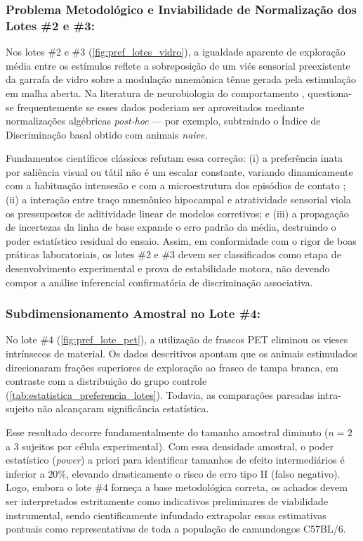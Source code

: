 \documentclass[11pt,a4paper,article,brazil]{abntex2}
\begin{document}
\subsubsection{Problema Metodológico e Inviabilidade de Normalização dos Lotes \#2 e \#3:}
Nos lotes \#2 e \#3 (\cref{fig:pref_lotes_vidro}), a igualdade aparente de exploração média entre os estímulos reflete a sobreposição de um viés sensorial preexistente da garrafa de vidro sobre a modulação mnemônica tênue gerada pela estimulação em malha aberta. Na literatura de neurobiologia do comportamento \cite{dix1999, leger2013}, questiona-se frequentemente se esses dados poderiam ser aproveitados mediante normalizações algébricas \emph{post-hoc} — por exemplo, subtraindo o Índice de Discriminação basal obtido com animais \emph{naive}.

Fundamentos científicos clássicos refutam essa correção: (i) a preferência inata por saliência visual ou tátil não é um escalar constante, variando dinamicamente com a habituação intensesão e com a microestrutura dos episódios de contato \cite{ennaceur1988}; (ii) a interação entre traço mnemônico hipocampal e atratividade sensorial viola os pressupostos de aditividade linear de modelos corretivos; e (iii) a propagação de incertezas da linha de base expande o erro padrão da média, destruindo o poder estatístico residual do ensaio. Assim, em conformidade com o rigor de boas práticas laboratoriais, os lotes \#2 e \#3 devem ser classificados como etapa de desenvolvimento experimental e prova de estabilidade motora, não devendo compor a análise inferencial confirmatória de discriminação associativa.


\subsubsection{Subdimensionamento Amostral no Lote \#4:}
No lote \#4 (\cref{fig:pref_lote_pet}), a utilização de frascos PET eliminou os vieses intrínsecos de material. Os dados descritivos apontam que os animais estimulados direcionaram frações superiores de exploração ao frasco de tampa branca, em contraste com a distribuição do grupo controle (\cref{tab:estatistica_preferencia_lotes}). Todavia, as comparações pareadas intra-sujeito não alcançaram significância estatística.

Esse resultado decorre fundamentalmente do tamanho amostral diminuto ($n = 2$ a $3$ sujeitos por célula experimental). Com essa densidade amostral, o poder estatístico (\emph{power}) a priori para identificar tamanhos de efeito intermediários é inferior a $20\%$, elevando drasticamente o risco de erro tipo II (falso negativo). Logo, embora o lote \#4 forneça a base metodológica correta, os achados devem ser interpretados estritamente como indicativos preliminares de viabilidade instrumental, sendo cientificamente infundado extrapolar essas estimativas pontuais como representativas de toda a população de camundongos C57BL/6.
\end{document}

